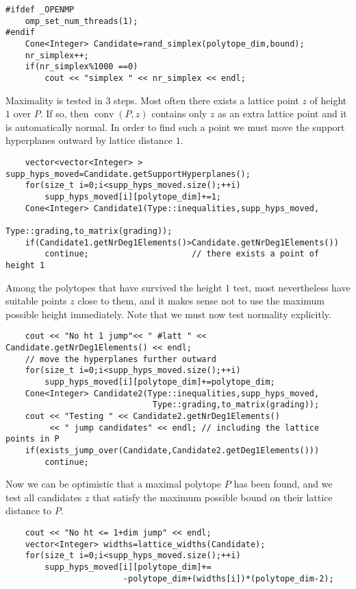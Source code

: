 \documentclass[12pt,a4paper]{scrartcl}
\theoremstyle{definition}
\begin{document}
\begin{small}
\begin{Verbatim}
#ifdef _OPENMP
	omp_set_num_threads(1);
#endif
    Cone<Integer> Candidate=rand_simplex(polytope_dim,bound);
    nr_simplex++;
    if(nr_simplex%1000 ==0)
        cout << "simplex " << nr_simplex << endl;
\end{Verbatim}
Maximality is tested in $3$ steps. Most often there exists a lattice  point $z$ of height $1$ over $P$. If so, then $\operatorname{conv}(P,z)$ contains only $z$ as an extra lattice point and it is automatically normal. In order to find such a point we must move the support hyperplanes outward by lattice distance $1$.
\begin{Verbatim}
    vector<vector<Integer> > supp_hyps_moved=Candidate.getSupportHyperplanes();
    for(size_t i=0;i<supp_hyps_moved.size();++i)
        supp_hyps_moved[i][polytope_dim]+=1;
    Cone<Integer> Candidate1(Type::inequalities,supp_hyps_moved, 
                                       Type::grading,to_matrix(grading));
    if(Candidate1.getNrDeg1Elements()>Candidate.getNrDeg1Elements()) 
        continue;                     // there exists a point of height 1        
\end{Verbatim}
Among the polytopes that have survived the height $1$ test, most nevertheless have suitable points $z$ close to them, and it makes sense not to use the maximum possible height immediately. Note that we must now test normality explicitly.
\begin{Verbatim}
    cout << "No ht 1 jump"<< " #latt " << Candidate.getNrDeg1Elements() << endl; 
    // move the hyperplanes further outward
    for(size_t i=0;i<supp_hyps_moved.size();++i)
        supp_hyps_moved[i][polytope_dim]+=polytope_dim; 
    Cone<Integer> Candidate2(Type::inequalities,supp_hyps_moved,
                              Type::grading,to_matrix(grading));
    cout << "Testing " << Candidate2.getNrDeg1Elements() 
         << " jump candidates" << endl; // including the lattice points in P                    
    if(exists_jump_over(Candidate,Candidate2.getDeg1Elements()))
        continue;
\end{Verbatim}
Now we can be optimistic that a maximal polytope $P$ has been found, and we test all candidates $z$ that satisfy the maximum possible bound on their lattice distance to $P$.
\begin{Verbatim}		
    cout << "No ht <= 1+dim jump" << endl;
    vector<Integer> widths=lattice_widths(Candidate);
    for(size_t i=0;i<supp_hyps_moved.size();++i)
        supp_hyps_moved[i][polytope_dim]+=
                        -polytope_dim+(widths[i])*(polytope_dim-2);
\end{Verbatim}

\end{small}
\end{document}
